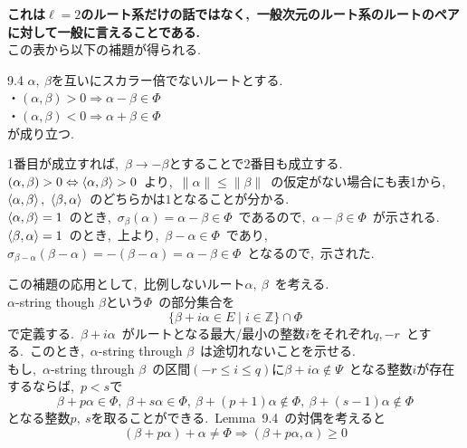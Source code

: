 \documentclass[uplatex,dvipdfmx]{jsarticle}
\begin{document}
\textbf{これは$\ell=2$のルート系だけの話ではなく,~一般次元のルート系のルートのペアに対して一般に言えることである.}\\
この表から以下の補題が得られる.
\begin{mylemma}{9.4}
    $\alpha,~\beta$を互いにスカラー倍でないルートとする.~\\
    ・$(\alpha,\beta) > 0 \Rightarrow \alpha - \beta \in \Phi$\\
    ・$(\alpha,\beta) < 0 \Rightarrow \alpha + \beta \in \Phi$\\
    が成り立つ.
\end{mylemma}
\begin{myproof}
    1番目が成立すれば,~$\beta \to -\beta$とすることで2番目も成立する.\\
    $(\alpha,\beta)>0 \Leftrightarrow \ev{\alpha,\beta} >0$~より,~$\|\alpha\| \leq \|\beta\|$~の仮定がない場合にも表1から,~$\ev{\alpha,\beta},~\ev{\beta,\alpha}$~のどちらかは$1$となることが分かる.\\
    $\ev{\alpha,\beta} = 1$~のとき,~$\sigma_\beta(\alpha) = \alpha - \beta \in \Phi$~であるので,~$\alpha - \beta \in \Phi$~が示される.\\
    $\ev{\beta,\alpha} = 1$~のとき,~上より,~$\beta - \alpha \in \Phi$~であり,~$\sigma_{\beta-\alpha}(\beta-\alpha) = -(\beta-\alpha) = \alpha-\beta \in \Phi$~となるので,~示された.
\end{myproof}
この補題の応用として,~比例しないルート$\alpha,~\beta$~を考える.\\
$\alpha$-string though $\beta$という$\Phi$~の部分集合を
\begin{equation*}
    \{\beta + i\alpha \in E \mid i \in \mathbb{Z}\} \cap \Phi
\end{equation*}
で定義する.~$\beta + i \alpha$~がルートとなる最大/最小の整数$i$をそれぞれ$q,-r$~とする.~このとき,~$\alpha$-string through $\beta$~は途切れないことを示せる.\\
もし,~$\alpha$-string through $\beta$~の区間$(-r \leq i \leq q)$に$\beta +i\alpha \notin \Psi$~となる整数$i$が存在するならば,~$p <s$で
\begin{equation*}
    \beta + p\alpha \in \Phi,~\beta + s\alpha \in \Phi,~\beta + (p+1)\alpha \notin \Phi,~\beta + (s-1)\alpha \notin \Phi
\end{equation*}
となる整数$p,~s$を取ることができる.~Lemma~9.4~の対偶を考えると
\begin{equation*}
    (\beta + p\alpha)+\alpha \neq \Phi \Rightarrow (\beta + p\alpha, \alpha) \geq 0
\end{equation*}
\end{document}
